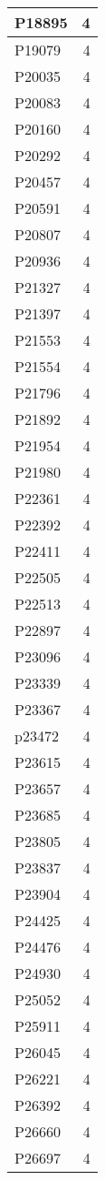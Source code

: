 \documentclass[
]{book}
\theoremstyle{definition}
\theoremstyle{definition}
\theoremstyle{definition}
\theoremstyle{definition}
\theoremstyle{remark}
\begin{document}
\begin{table}
\begin{tabular}{l|r}
\hline
P18895 & 4\\
\hline
P19079 & 4\\
\hline
P20035 & 4\\
\hline
P20083 & 4\\
\hline
P20160 & 4\\
\hline
P20292 & 4\\
\hline
P20457 & 4\\
\hline
P20591 & 4\\
\hline
P20807 & 4\\
\hline
P20936 & 4\\
\hline
P21327 & 4\\
\hline
P21397 & 4\\
\hline
P21553 & 4\\
\hline
P21554 & 4\\
\hline
P21796 & 4\\
\hline
P21892 & 4\\
\hline
P21954 & 4\\
\hline
P21980 & 4\\
\hline
P22361 & 4\\
\hline
P22392 & 4\\
\hline
P22411 & 4\\
\hline
P22505 & 4\\
\hline
P22513 & 4\\
\hline
P22897 & 4\\
\hline
P23096 & 4\\
\hline
P23339 & 4\\
\hline
P23367 & 4\\
\hline
p23472 & 4\\
\hline
P23615 & 4\\
\hline
P23657 & 4\\
\hline
P23685 & 4\\
\hline
P23805 & 4\\
\hline
P23837 & 4\\
\hline
P23904 & 4\\
\hline
P24425 & 4\\
\hline
P24476 & 4\\
\hline
P24930 & 4\\
\hline
P25052 & 4\\
\hline
P25911 & 4\\
\hline
P26045 & 4\\
\hline
P26221 & 4\\
\hline
P26392 & 4\\
\hline
P26660 & 4\\
\hline
P26697 & 4\\

\end{tabular}
\end{table}
\end{document}
